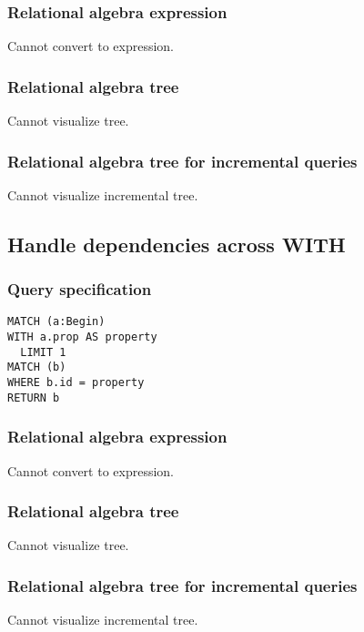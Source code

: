 \subsubsection*{Relational algebra expression}

Cannot convert to expression.

\subsubsection*{Relational algebra tree}

Cannot visualize tree.

\subsubsection*{Relational algebra tree for incremental queries}

Cannot visualize incremental tree.

\subsection{Handle dependencies across WITH}

\subsubsection*{Query specification}

\begin{lstlisting}
MATCH (a:Begin)
WITH a.prop AS property
  LIMIT 1
MATCH (b)
WHERE b.id = property
RETURN b
\end{lstlisting}

\subsubsection*{Relational algebra expression}

Cannot convert to expression.

\subsubsection*{Relational algebra tree}

Cannot visualize tree.

\subsubsection*{Relational algebra tree for incremental queries}

Cannot visualize incremental tree.

